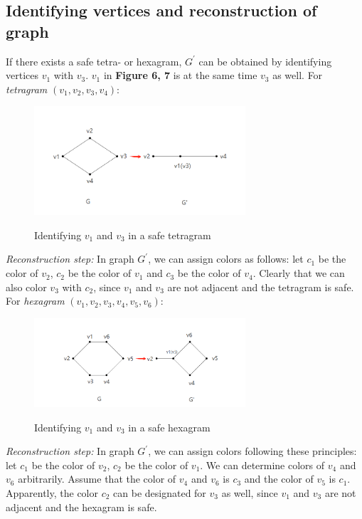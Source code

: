 \subsection{Identifying vertices and reconstruction of graph}

If there exists a safe tetra- or hexagram, $G^{'}$ can be obtained by identifying vertices $v_1$ with $v_3$. $v_1$ in \textbf{Figure 6, 7} is at the same time $v_3$ as well. For \textit{tetragram} $(v_1, v_2, v_3, v_4)$:
\begin{figure}[H] %
\centering %
\includegraphics[width=0.7\textwidth]{figure/identifyingv1v3.png} 
\label{figure} %
\caption{Identifying $v_1$ and $v_3$ in a safe tetragram}
\end{figure}

\textit{Reconstruction step: }In graph $G^{'}$, we can assign colors as follows: let $c_1$ be the color of $v_2$, $c_2$ be the color of $v_1$ and $c_3$ be the color of $v_4$. Clearly that we can also color $v_3$ with $c_2$, since $v_1$ and $v_3$ are not adjacent and the tetragram is safe.\\

For \textit{hexagram} $(v_1, v_2, v_3, v_4, v_5, v_6)$: 
\begin{figure}[H] %
\centering %
\includegraphics[width=0.7\textwidth]{figure/identifyingv1v32.png} 
\label{figure} %
\caption{Identifying $v_1$ and $v_3$ in a safe hexagram}
\end{figure}

\textit{Reconstruction step: }In graph $G^{'}$, we can assign colors following these principles: let $c_1$ be the color of $v_2$, $c_2$ be the color of $v_1$. We can determine colors of $v_4$ and $v_6$ arbitrarily. Assume that the color of $v_4$ and $v_6$ is $c_3$ and the color of $v_5$ is $c_1$. Apparently, the color $c_2$ can be designated for $v_3$ as well, since $v_1$ and $v_3$ are not adjacent and the hexagram is safe.\\

